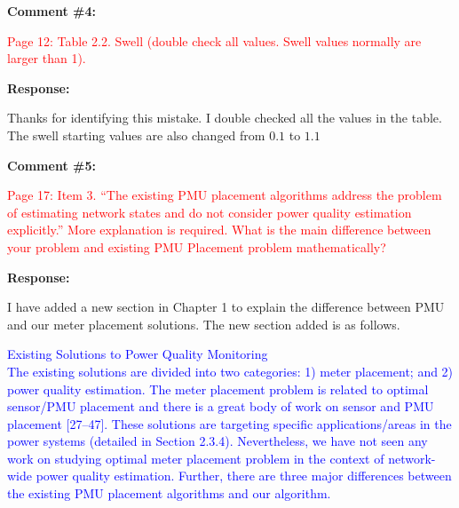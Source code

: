 \documentclass[journal]{IEEEtran}
\begin{document}
\vspace{20pt}
\textbf{Comment \#4:}
\begin{adjustwidth}{2.5em}{0pt}
\singlespacing \vspace{-10pt}
\textcolor{red}{Page 12: Table 2.2. Swell (double check all values. Swell values normally are larger than 1).}
\end{adjustwidth}

\vspace{10pt}
\textbf{Response:}
\begin{adjustwidth}{2.5em}{0pt}
Thanks for identifying this mistake. I double checked all the values in the table. The swell starting values are also changed from $0.1$ to $1.1$
\end{adjustwidth}



\vspace{30pt}
\textbf{Comment \#5:}
\begin{adjustwidth}{2.5em}{0pt}
\singlespacing \vspace{-10pt}
\textcolor{red}{Page 17: Item 3. “The existing PMU placement algorithms address the problem of estimating network states and do not consider power quality estimation explicitly.” More explanation is required. What is the main difference between your problem and existing PMU Placement problem mathematically?}
\end{adjustwidth}

\vspace{10pt}
\textbf{Response:}
\begin{adjustwidth}{2.5em}{0pt}
I have added a new section in Chapter 1 to explain the difference between PMU and our meter placement solutions. The new section added is as follows.

\end{adjustwidth}

\vspace{5pt}
\begin{adjustwidth}{2.5em}{0pt}
\noindent\textcolor{blue}{{\Large Existing Solutions to Power Quality Monitoring} \vspace{0.4em} \\
The existing solutions are divided into two categories: 1) meter placement; and 2) power quality estimation. The meter placement problem is related to optimal sensor/PMU placement and there is a great body of work on sensor and PMU placement [27--47]. These solutions are targeting specific applications/areas in the power systems (detailed in Section 2.3.4). Nevertheless, we have not seen any work on studying optimal meter placement problem in the context of network-wide power quality estimation. Further, there are three major differences between the existing PMU placement algorithms and our algorithm.}\end{adjustwidth}
\end{document}
